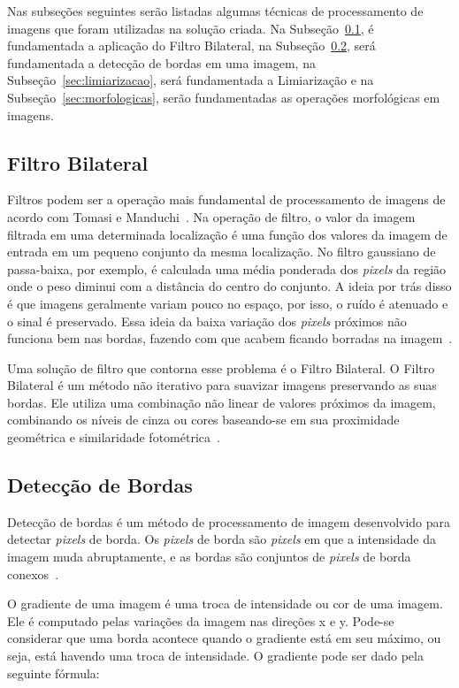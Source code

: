 Nas subseções seguintes serão listadas algumas técnicas de processamento de
imagens que foram utilizadas na solução criada. Na
Subseção~\ref{sec:bilateralfilter}, é fundamentada a aplicação do Filtro
Bilateral, na Subseção~\ref{sec:detecbordas}, será fundamentada a detecção de
bordas em uma imagem, na Subseção~\ref{sec:limiarizacao}, será fundamentada a
Limiarização e na Subseção~\ref{sec:morfologicas}, serão fundamentadas as
operações morfológicas em imagens.

\subsection{Filtro Bilateral}
\label{sec:bilateralfilter}

Filtros podem ser a operação mais fundamental de processamento de imagens de
acordo com Tomasi e Manduchi~\cite{tomasi1998bilateral}. Na operação de filtro,
o valor da imagem filtrada em uma determinada localização é uma função dos
valores da imagem de entrada em um pequeno conjunto da mesma localização. No
filtro gaussiano de passa-baixa, por exemplo, é calculada uma média ponderada
dos \emph{pixels} da região onde o peso diminui com a distância do centro do
conjunto. A ideia por trás disso é que imagens geralmente variam pouco no
espaço, por isso, o ruído é atenuado e o sinal é preservado. Essa ideia da baixa
variação dos \emph{pixels} próximos não funciona bem nas bordas, fazendo com que
acabem ficando borradas na imagem~\cite{tomasi1998bilateral}.

Uma solução de filtro que contorna esse problema é o Filtro Bilateral. O Filtro Bilateral é um método não iterativo para suavizar imagens preservando as suas bordas. Ele utiliza uma combinação não linear de valores próximos da imagem, combinando os níveis de cinza ou cores baseando-se em sua proximidade geométrica e similaridade fotométrica~\cite{tomasi1998bilateral}.

\subsection{Detecção de Bordas}
\label{sec:detecbordas}

Detecção de bordas é um método de processamento de imagem desenvolvido para detectar \emph{pixels} de borda. Os \emph{pixels} de borda são \emph{pixels} em que a intensidade da imagem muda abruptamente, e as bordas são conjuntos de \emph{pixels} de borda conexos~\cite{gonzalez1977digital}.

O gradiente de uma imagem é uma troca de intensidade ou cor de uma imagem. Ele é computado pelas variações da imagem nas direções x e y. Pode-se considerar que uma borda acontece quando o gradiente está em seu máximo, ou seja, está havendo uma troca de intensidade. O gradiente pode ser dado pela seguinte fórmula:

